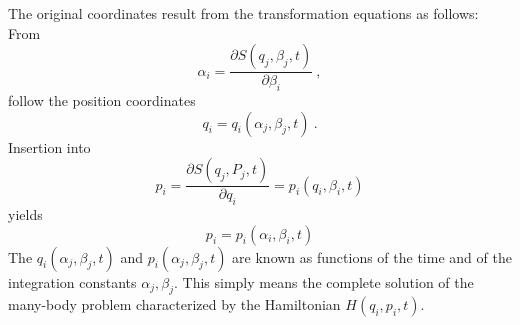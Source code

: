 \documentclass[11pt,a4paper]{article}
\begin{document}
The original coordinates result from the transformation equations as follows: From
\begin{equation*}
\alpha_i = \dfrac{\partial S(q_j, \beta_j, t)}{\partial \beta_i} ~,
\end{equation*}
follow the position coordinates
\begin{equation*}
q_i = q_i(\alpha_j, \beta_j, t) ~.
\end{equation*}
Insertion into
\begin{equation*}
p_i = \dfrac{\partial S(q_j, P_j, t)}{\partial q_i}  = p_i(q_i, \beta_i, t)
\end{equation*}
yields
\begin{equation*}
p_i = p_i(\alpha_i, \beta_i, t)
\end{equation*}
The $q_i(\alpha_j, \beta_j, t)$ and $p_i(\alpha_j, \beta_j, t)$ are known as functions of the time and of the integration constants $\alpha_j , \beta_j$. This simply means the complete solution of the many-body problem characterized by the Hamiltonian $H(q_i, p_i, t)$.
\end{document}
